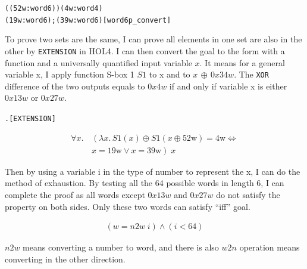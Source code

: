 \documentclass{article}
\begin{document}
\begin{alltt}
  \HOLTokenTurnstile{} \HOLTokenLeftbrace{} \HOLTokenBar{}   \HOLSymConst{\HOLTokenEor{}}  ( \HOLSymConst{\HOLTokenEor{}} (52w :word6)) \HOLSymConst{=} (4w :word4)\HOLTokenRightbrace{} \HOLSymConst{=}
   \HOLTokenLeftbrace{}(19w :word6); (39w :word6)\HOLTokenRightbrace{}\hfill{[word6p_convert]}
\end{alltt}

To prove two sets are the same, I can prove all elements in one set are also in the other by \verb|EXTENSION|
in HOL4. I can then convert the goal to the form with a function and a universally quantified input
variable $x$. It means for a general variable x, I apply function S-box 1 $S1$ to x and to $x\,\oplus\, 0x34w$.
The \verb|XOR| difference of the two outputs equals to $0x4w$ if and only if variable x is either $0x13w$ or $0x27w$.

\begin{alltt}
  \HOLTokenTurnstile{}  \HOLSymConst{=}  \HOLSymConst{\HOLTokenEquiv{}} \HOLSymConst{\HOLTokenForall{}}.  \HOLSymConst{\HOLTokenIn{}}  \HOLSymConst{\HOLTokenEquiv{}}  \HOLSymConst{\HOLTokenIn{}} \hfill{[EXTENSION]}
\end{alltt}

\begin{equation*}
\begin{split}
   \forall x.\, &\left( \lambda x.\, S1(x) \oplus S1(x \oplus 52\text{w}) = 4\text{w} \Leftrightarrow \right. \\
   & \left. x = 19\text{w} \vee x = 39\text{w} \right)\; x
\end{split}
\end{equation*}

Then by using a variable i in the type of number to represent the x, I can do the method of exhaustion. By testing
all the 64 possible words in length 6, I can complete the proof as all words except $0x13w$ and $0x27w$ do not
satisfy the property on both sides. Only these two words can satisfy ``iff'' goal.

\begin{equation*}
\begin{split}
    (w = n2w \; i) \land (i < 64)
\end{split}
\end{equation*}

$n2w$ means converting a number to word, and there is also $w2n$ operation means converting in the other direction.
\end{document}

